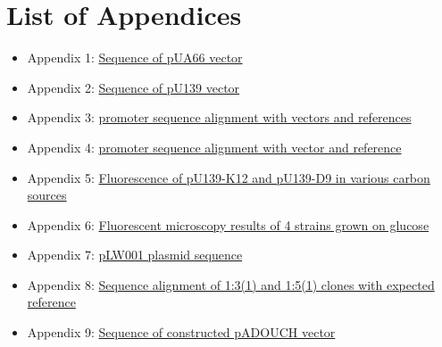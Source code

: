 \chapter*{List of Appendices}

\begin{itemize}[label={}]
\item Appendix 1: \hypertarget{pUA66seq}{\href{https://drive.google.com/open?id=1oHOr45i53oj1ZvaJO2rwhhKW336-1qDa}{Sequence of pUA66 vector}}
\item Appendix 2: \hypertarget{p139seq}{\href{https://drive.google.com/open?id=1eTZO0u8nTtbIphnsHlNvB4G_L2-LnJ-f}{Sequence of pU139 vector}}
\item Appendix 3: \hypertarget{placZalign}{\href{https://drive.google.com/open?id=1uxseqbHVccpsxmKUuVl5_nBY2wEvpF8J}{ promoter sequence alignment with vectors and references}}
\item Appendix 4: \hypertarget{precAalign}{\href{https://drive.google.com/open?id=1g5AUZ4vEhNVGWuKy9A7augQ2beI5EW9o}{ promoter sequence alignment with vector and reference}}
\item Appendix 5: \hypertarget{FCnegs}{\href{https://drive.google.com/open?id=1M2mKz7TUkuwOr1n_dIoUlk9kRn0nOF99}{Fluorescence of pU139-K12 and pU139-D9 in various carbon sources}}
\item Appendix 6: \hypertarget{micro}{\href{https://drive.google.com/open?id=1h8jhDRwhoUOt7Oe9xyGIedzs1iUxh3AZ}{Fluorescent microscopy results of 4 strains grown on glucose}}
\item Appendix 7: \hypertarget{pLW001}{\href{https://drive.google.com/open?id=1HhTVjaBZxkOQPb05qaPJYQk1XmyXM7zO}{pLW001 plasmid sequence}}
\item Appendix 8: \hypertarget{pADOUCHseq}{\href{https://drive.google.com/open?id=1RT7LigW9waKPSw4mTKGJVCJavP3P0kWW}{Sequence alignment of 1:3(1) and 1:5(1) clones with expected reference}}
\item Appendix 9: \hypertarget{pADOUCHwhole}{\href{https://drive.google.com/open?id=1kS7Ih-cgBlwvxuMc4spGqSF4MdvcVV9f}{Sequence of constructed pADOUCH vector}}
\end{itemize}

\cleardoublepage%
